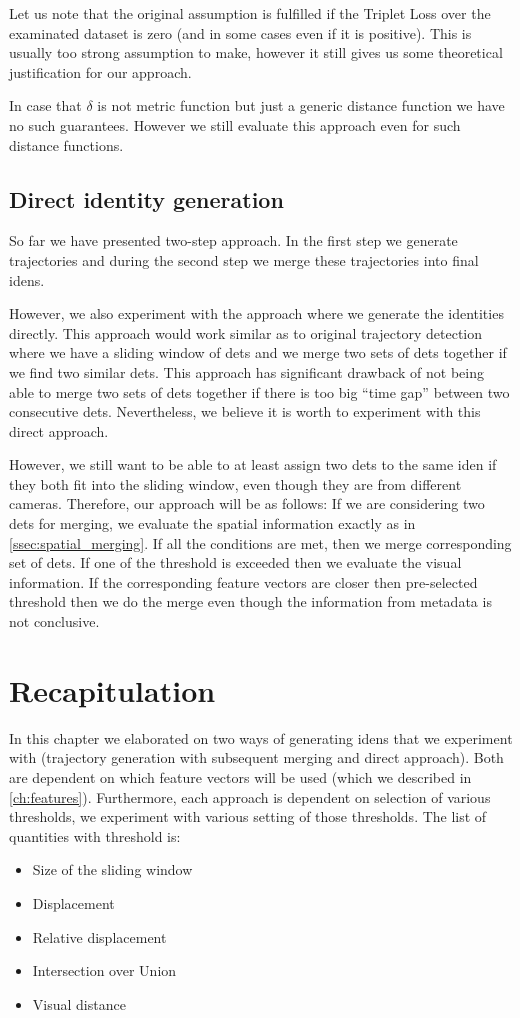 Let us note that the original assumption is fulfilled if the Triplet Loss
over the examinated dataset is zero (and in some cases even if it is positive).
This is usually too strong assumption to make, however it still gives us some
theoretical justification for our approach.

In case that $\delta$ is not metric function but just a generic distance
function we have no such guarantees. However we still evaluate this approach
even for such distance functions.

\subsection{Direct identity generation}

So far we have presented two-step approach. In the first step we generate
trajectories and during the second step we merge these trajectories into
final \glspl{iden}.

However, we also experiment with the approach where we
generate the identities directly. This approach would work similar as to
original trajectory detection where we have a sliding window of \glspl{det}
and we merge two sets of \glspl{det} together if we find two similar
\glspl{det}. This approach has significant drawback of not being able to
merge two sets of \glspl{det} together if there is too big ``time gap'' between
two consecutive \glspl{det}. Nevertheless, we believe it is worth to experiment
with this direct approach.

However, we still want to be able to at least assign two \glspl{det} to the
same \gls{iden} if they both fit into the sliding window, even though they are
from different cameras. Therefore, our approach will be as follows: If we are
considering two \glspl{det} for merging, we evaluate the spatial information
exactly as in \autoref{ssec:spatial_merging}. If all the conditions are met,
then we merge corresponding set of \glspl{det}. If one of the threshold is
exceeded then we evaluate the visual information. If the corresponding feature
vectors are closer then pre-selected threshold then we do the merge even though
the information from metadata is not conclusive.

\section{Recapitulation}

In this chapter we elaborated on two ways of generating \glspl{iden} that we
experiment with (trajectory generation with subsequent merging and direct
approach). Both are dependent on which feature vectors will be used (which we
described in \autoref{ch:features}). Furthermore, each approach is dependent
on selection of various thresholds, we experiment with various setting of those
thresholds. The list of quantities with threshold is:

\begin{itemize}
    \item Size of the sliding window
    \item Displacement
    \item Relative displacement
    \item Intersection over Union
    \item Visual distance
\end{itemize}